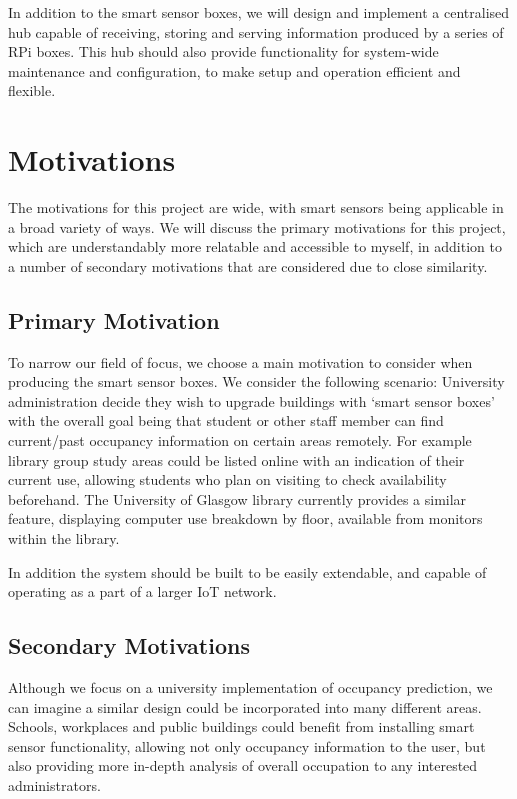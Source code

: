 \documentclass{l4proj}
\begin{document}
In addition to the smart sensor boxes, we will design and implement a centralised hub capable of receiving, storing and serving information produced by a series of RPi boxes. This hub should also provide functionality for system-wide maintenance and configuration, to make setup and operation efficient and flexible.


\section{Motivations}
The motivations for this project are wide, with smart sensors being applicable in a broad variety of ways. We will discuss the primary motivations for this project, which are understandably more relatable and accessible to myself, in addition to a number of secondary motivations that are considered due to close similarity.

\subsection{Primary Motivation}
To narrow our field of focus, we choose a main motivation to consider when producing the smart sensor boxes. We consider the following scenario: University administration decide they wish to upgrade buildings with ‘smart sensor boxes’ with the overall goal being that student or other staff member can find current/past occupancy information on certain areas remotely. For example library group study areas could be listed online with an indication of their current use, allowing students who plan on visiting to check availability beforehand.
The University of Glasgow library currently provides a similar feature, displaying computer use breakdown by floor, available from monitors within the library.

In addition the system should be built to be easily extendable, and capable of operating as a part of a larger IoT network.

\subsection{Secondary Motivations}
Although we focus on a university implementation of occupancy prediction, we can imagine a similar design could be incorporated into many different areas. Schools, workplaces and public buildings could benefit from installing smart sensor functionality, allowing not only occupancy information to the user, but also providing more in-depth analysis of overall occupation to any interested administrators.
\end{document}
